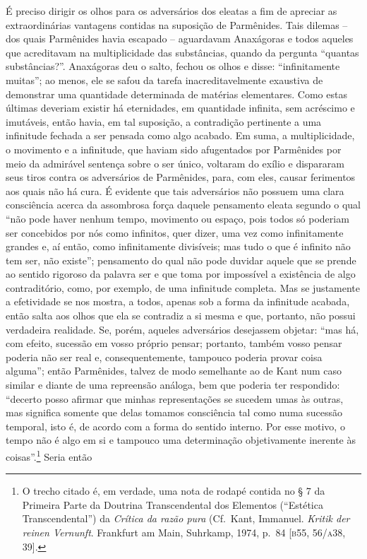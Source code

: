 É preciso dirigir os olhos para os adversários dos eleatas a fim de
apreciar as extraordinárias vantagens contidas na suposição de
Parmênides. Tais dilemas -- dos quais Parmênides havia escapado --
aguardavam Anaxágoras e todos aqueles que acreditavam na multiplicidade
das substâncias, quando da pergunta ``quantas substâncias?''. Anaxágoras
deu o salto, fechou os olhos e disse: ``infinitamente muitas''; ao menos,
ele se safou da tarefa inacreditavelmente exaustiva de demonstrar uma
quantidade determinada de matérias elementares. Como estas últimas
deveriam existir há eternidades, em quantidade infinita, sem acréscimo
e imutáveis, então havia, em tal suposição, a contradição pertinente a
uma infinitude fechada a ser pensada como algo acabado. Em suma, a
multiplicidade, o movimento e a infinitude, que haviam sido afugentados
por Parmênides por meio da admirável sentença sobre o ser único,
voltaram do exílio e dispararam seus tiros contra os adversários de
Parmênides, para, com eles, causar ferimentos aos quais não há cura. É
evidente que tais adversários não possuem uma clara consciência acerca
da assombrosa força daquele pensamento eleata segundo o qual ``não pode
haver nenhum tempo, movimento ou espaço, pois todos só poderiam ser
concebidos por nós como infinitos, quer dizer, uma vez como
infinitamente grandes e, aí então, como infinitamente divisíveis; mas
tudo o que é infinito não tem ser, não existe''; pensamento do qual não
pode duvidar aquele que se prende ao sentido rigoroso da palavra ser e
que toma por impossível a existência de algo contraditório, como, por
exemplo, de uma infinitude completa. Mas se justamente a efetividade
se nos mostra, a todos, apenas sob a forma da infinitude acabada, então
salta aos olhos que ela se contradiz a si mesma e que, portanto, não
possui verdadeira realidade. Se, porém, aqueles adversários desejassem
objetar: ``mas há, com efeito, sucessão em vosso próprio pensar;
portanto, também vosso pensar poderia não ser real e, consequentemente,
tampouco poderia provar coisa alguma''; então Parmênides, talvez de modo
semelhante ao de Kant num caso similar e diante de uma repreensão
análoga, bem que poderia ter respondido: ``decerto posso afirmar que
minhas representações se sucedem umas às outras, mas significa somente
que delas tomamos consciência tal como numa sucessão temporal, isto é,
de acordo com a forma do sentido interno. Por esse motivo, o tempo não
é algo em si e tampouco uma determinação objetivamente inerente às
coisas''.\footnote{ O trecho citado é, em verdade, uma nota de rodapé
contida no § 7 da Primeira Parte da Doutrina Transcendental dos
Elementos (``Estética Transcendental'') da \textit{Crítica da razão pura}
(Cf.~Kant, Immanuel. \textit{Kritik der reinen Vernunft}. Frankfurt am
Main, Suhrkamp, 1974, p.~84 [\textsc{b}55, 56/\textsc{a}38, 39].} Seria então
